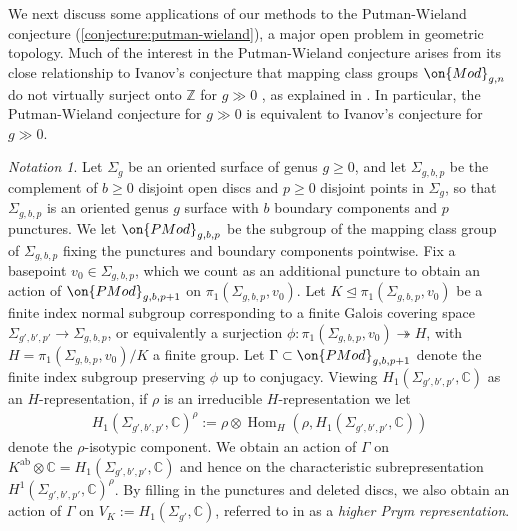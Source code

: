 \documentclass[12 pt]{amsart}
\theoremstyle{plain}
\theoremstyle{definition}
\theoremstyle{remark}
\newtheorem{notation}[subsubsection]{Notation}
\numberwithin{equation}{section}
\DeclareMathOperator\Hom{Hom}
\begin{document}
We next discuss some applications of our methods to the Putman-Wieland
conjecture (\autoref{conjecture:putman-wieland}), a major open problem in geometric topology. Much of the interest in the Putman-Wieland conjecture arises from its close relationship to Ivanov's conjecture that mapping class groups $\on{Mod}_{g,n}$ do not virtually surject onto $\mathbb{Z}$ for $g\gg 0$ \cite[\S7]{Ivanov:problems}, as explained in
\cite[Theorem 1.3]{putmanW:abelian-quotients}. In particular, the Putman-Wieland conjecture for $g\gg 0$ is equivalent to Ivanov's conjecture for $g\gg 0$.
\begin{notation}
	\label{notation:prym}
Let $\Sigma_g$ be an oriented surface of genus $g \geq 0$, and let
$\Sigma_{g,b,p}$ be the complement of $b\geq 0$ disjoint open discs and $p\geq 0$ disjoint points in $\Sigma_g$, so that $\Sigma_{g,b,p}$ is an oriented genus $g$ surface with $b$ boundary components and $p$ punctures. We let $\on{PMod}_{g,b,p}$ be the subgroup of the mapping class group of $\Sigma_{g,b,p}$ fixing the punctures and boundary components pointwise.
Fix a basepoint $v_0 \in \Sigma_{g,b,p}$, which we count as an additional puncture to
obtain an action of $\on{PMod}_{g,b,p+1}$ on $\pi_1(\Sigma_{g,b,p},v_0)$.
Let $K \trianglelefteq \pi_1(\Sigma_{g,b,p}, v_0)$ be a finite index normal subgroup
corresponding to a finite Galois covering space $\Sigma_{g',b',p'} \to \Sigma_{g,b,p}$,
or equivalently a surjection
$\phi: \pi_1(\Sigma_{g,b,p}, v_0) \twoheadrightarrow H$, with $H=\pi_1(\Sigma_{g,b,p}, v_0)/K$ a finite group.
Let $\Gamma \subset \on{PMod}_{g,b,p+1}$ denote the finite index subgroup preserving
$\phi$ up to conjugacy.
Viewing
$H_1(\Sigma_{g',b',p'},\mathbb C)$ as an $H$-representation,
if $\rho$ is an irreducible $H$-representation we let 
\begin{align*}
	H_1(\Sigma_{g',b',p'},\mathbb C)^\rho := \rho \otimes \Hom_H(\rho,
H_1(\Sigma_{g',b',p'},\mathbb C))
\end{align*}
denote the $\rho$-isotypic component.
We obtain an action of $\Gamma$ on $K^{\text{ab}}\otimes \mathbb{C}=H_1(\Sigma_{g',b',p'},\mathbb C)$
and hence on the characteristic subrepresentation
$H^1(\Sigma_{g',b',p'},\mathbb C)^\rho$.
By filling in the punctures and deleted discs, we also obtain
an action of $\Gamma$ on $V_K := H_1(\Sigma_{g'}, \mathbb C)$, referred to in 
\cite[p. 80-81]{putmanW:abelian-quotients} as a {\em higher Prym
representation}.
\end{notation}
\end{document}
